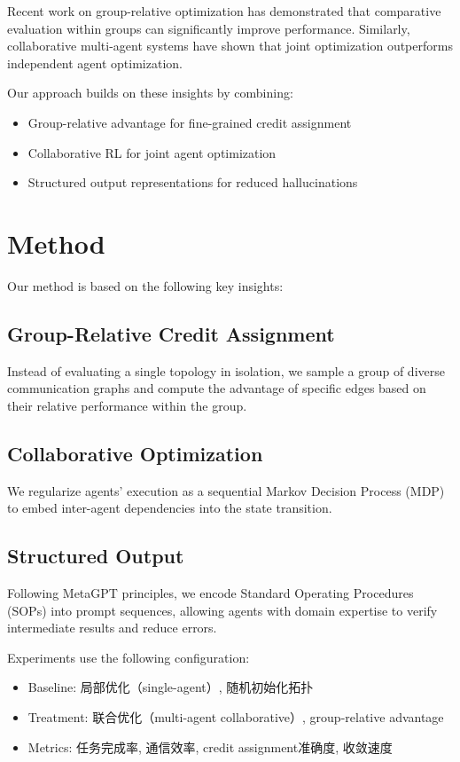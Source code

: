 \documentclass[11pt,a4paper]{article}
\begin{document}
Recent work on group-relative optimization has demonstrated that
comparative evaluation within groups can significantly improve performance.
Similarly, collaborative multi-agent systems have shown that
joint optimization outperforms independent agent optimization.

Our approach builds on these insights by combining:
\begin{itemize}
\item Group-relative advantage for fine-grained credit assignment
\item Collaborative RL for joint agent optimization
\item Structured output representations for reduced hallucinations
\end{itemize}

\section{Method}
Our method is based on the following key insights:

\subsection{Group-Relative Credit Assignment}
Instead of evaluating a single topology in isolation, we sample a group of
diverse communication graphs and compute the advantage of specific edges
based on their relative performance within the group.

\subsection{Collaborative Optimization}
We regularize agents' execution as a sequential Markov Decision Process (MDP)
to embed inter-agent dependencies into the state transition.

\subsection{Structured Output}
Following MetaGPT principles, we encode Standard Operating Procedures (SOPs)
into prompt sequences, allowing agents with domain expertise to verify
intermediate results and reduce errors.

Experiments use the following configuration:
\begin{itemize}
\item Baseline: 局部优化（single-agent）, 随机初始化拓扑
\item Treatment: 联合优化（multi-agent collaborative）, group-relative advantage
\item Metrics: 任务完成率, 通信效率, credit assignment准确度, 收敛速度
\end{itemize}
\end{document}

